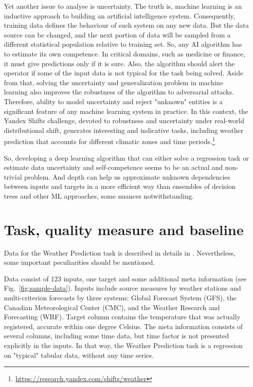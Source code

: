 \documentclass{article}
\begin{document}
Yet another issue to analyse is uncertainty. The truth is, machine learning is an inductive approach to building an artificial intelligence system. Consequently, training data defines the behaviour of such system on any new data. But the data source can be changed, and the next portion of data will be sampled from a different statistical population relative to training set. So, any AI algorithm has to estimate its own competence. In critical domains, such as medicine or finance, it must give predictions only if it is sure. Also, the algorithm should alert the operator if some of the input data is not typical for the task being solved. Aside from that, solving the uncertainty and generalization problem in machine learning also improves the robustness of the algorithm to adversarial attacks. Therefore, ability to model uncertainty and reject "unknown" entities is a significant feature of any machine learning system in practice. In this context, the Yandex Shifts challenge, devoted to robustness and uncertainty under real-world distributional shift, generates interesting and indicative tasks, including weather prediction that accounts for different climatic zones and time periods.\footnote{\url{https://research.yandex.com/shifts/weather}}

So, developing a deep learning algorithm that can either solve a regression task or estimate data uncertainty and self-competence seems to be an actual and non-trivial problem. And depth can help us approximate unknown dependencies between inputs and targets in a more efficient way than ensembles of decision trees and other ML approaches, some nuances notwithstanding.

\section{Task, quality measure and baseline}
\label{baseline}

Data for the Weather Prediction task is described in details in \cite{Malinin2021shifts}. Nevertheless, some important peculiarities should be mentioned.

Data consist of 123 inputs, one target and some additional meta information (see Fig.~\ref{fig:sample-data}). Inputs include source measures by weather stations and multi-criterion forecasts by three systems:  Global Forecast System (GFS), the Canadian Meteorological Center (CMC), and the Weather Research and Forecasting (WRF). Target column contains the temperature that was actually registered, accurate within one degree Celsius. The meta information consists of several columns, including some time data, but time factor is not presented explicitly in the inputs. In that way, the Weather Prediction task is a regression on "typical" tabular data, without any time series.
\end{document}
